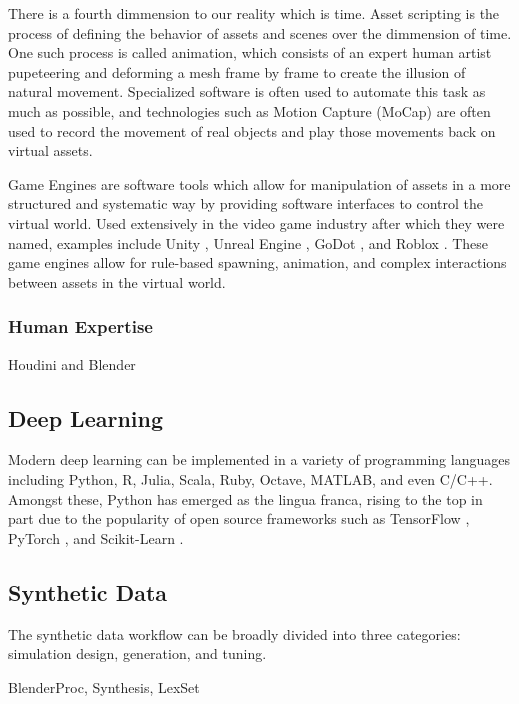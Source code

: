 \documentclass{article}
\begin{document}
There is a fourth dimmension to our reality which is time. Asset scripting is the process of defining the behavior of assets and scenes over the dimmension of time. One such process is called animation, which consists of an expert human artist pupeteering and deforming a mesh frame by frame to create the illusion of natural movement. Specialized software is often used to automate this task as much as possible, and technologies such as Motion Capture (MoCap) are often used to record the movement of real objects and play those movements back on virtual assets.

Game Engines are software tools which allow for manipulation of assets in a more structured and systematic way by providing software interfaces to control the virtual world. Used extensively in the video game industry after which they were named, examples include Unity \citep{unity3d}, Unreal Engine \citep{unrealengine}, GoDot \citep{godot}, and Roblox \citep{roblox}. These game engines allow for rule-based spawning, animation, and complex interactions between assets in the virtual world.

\subsubsection{Human Expertise}
\label{sec:humanexpertise}

Houdini \citep{houdini} and Blender \citep{blender}

\subsection{Deep Learning}
\label{sec:deeplearning}

Modern deep learning can be implemented in a variety of programming languages including Python, R, Julia, Scala, Ruby, Octave, MATLAB, and even C/C++. Amongst these, Python has emerged as the lingua franca, rising to the top in part due to the popularity of open source frameworks such as TensorFlow \citep{tensorflow}, PyTorch \citep{pytorch}, and Scikit-Learn \citep{scikit-learn}.

\subsection{Synthetic Data}
\label{sec:syntheticdata}

The synthetic data workflow can be broadly divided into three categories: simulation design, generation, and tuning.

BlenderProc, Synthesis, LexSet
\end{document}
